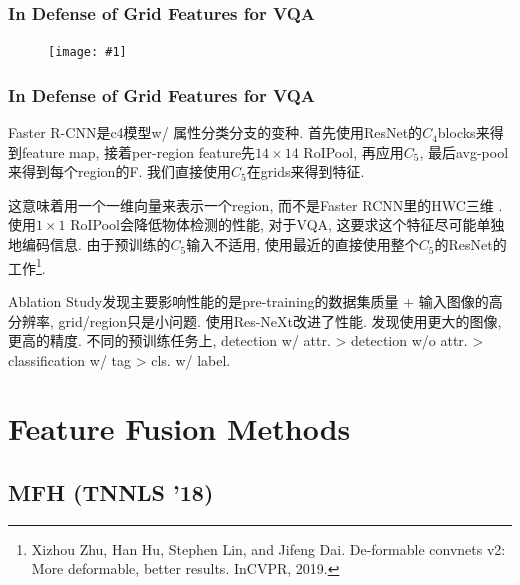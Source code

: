\documentclass{beamer}
\newcommand{\cfig}[2]{
    \begin{figure}[htbp]
    \centering
    \texttt{[image: \#1]}
\end{figure}
}
\begin{document}
\begin{frame}
    \frametitle{In Defense of Grid Features for VQA}

    \cfig{gridfeat-comp.png}{1.0}

\end{frame}

\begin{frame}
    \frametitle{In Defense of Grid Features for VQA}

    Faster R-CNN是c4模型w/ 属性分类分支的变种. 首先使用ResNet的$C_4$blocks来得到feature map, 接着per-region feature先$14\times 14$ RoIPool, 再应用$C_5$, 最后avg-pool来得到每个region的F. 我们直接使用$C_5$在grids来得到特征.

    这意味着用一个一维向量来表示一个region, 而不是Faster RCNN里的HWC三维 .使用$1\times 1$ RoIPool会降低物体检测的性能, 对于VQA, 这要求这个特征尽可能单独地编码信息. 由于预训练的$C_5$输入不适用, 使用最近的直接使用整个$C_5$的ResNet的工作\footnote{
        Xizhou Zhu, Han Hu, Stephen Lin, and Jifeng Dai.  De-formable convnets v2: More deformable, better results. InCVPR, 2019.
    }.

    Ablation Study发现主要影响性能的是pre-training的数据集质量 + 输入图像的高分辨率, grid/region只是小问题. 使用Res-NeXt改进了性能. 发现使用更大的图像, 更高的精度. 不同的预训练任务上, detection w/ attr. > detection w/o attr. > classification w/ tag > cls. w/ label.

\end{frame}



    


\section{Feature Fusion Methods}

\subsection{MFH (TNNLS '18)}
\end{document}
